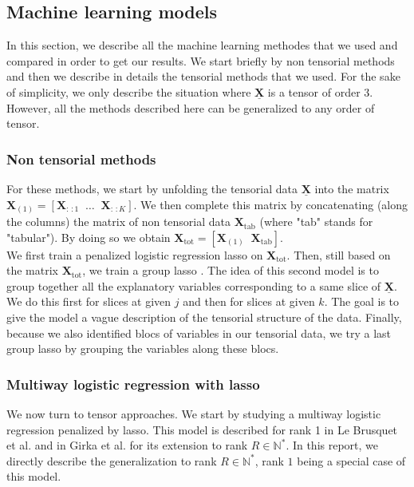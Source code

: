 \documentclass[10pt]{article}
\begin{document}
\subsection{Machine learning models}

In this section, we describe all the machine learning methodes that we used and compared in order to get our results. We start briefly by non tensorial methods and then we describe in details the tensorial methods that we used. For the sake of simplicity, we only describe the situation where $\underline{\mathbf{X}}$ is a tensor of order 3. However, all the methods described here can be generalized to any order of tensor.
\subsubsection{Non tensorial methods}
For these methods, we start by unfolding the tensorial data $\underline{\mathbf{X}}$ into the matrix $\mathbf{X}_{(1)} = [\mathbf{X}_{:\,:1}\; \; \ldots \; \;\mathbf{X}_{:\,:K}]$. We then complete this matrix  by concatenating (along the columns) the matrix of non tensorial data $\mathbf{X}_{\text{tab}}$ (where "tab" stands for "tabular"). By doing so we obtain $\mathbf{X}_{\text{tot}} = [\mathbf{X}_{(1)} \; \; \mathbf{X}_{\text{tab}}]$.\\
\indent We first train a penalized logistic regression lasso on $\mathbf{X}_{\text{tot}}$. Then, still based on the matrix $\mathbf{X}_{\text{tot}}$, we train a group lasso \cite{grp_lasso}. The idea of this second model is to group together all the explanatory variables corresponding to a same slice of $\underline{\mathbf{X}}$. We do this first for slices at given $j$ and then for slices at given $k$.  The goal is to give the model a vague description of the tensorial structure of the data. Finally, because we also identified blocs of variables in our tensorial data, we try a last group lasso by grouping the variables along these blocs.

\subsubsection{Multiway logistic regression with lasso}
\indent We now turn to tensor approaches. We start by studying a multiway logistic regression penalized by lasso. This model is described for rank 1 in Le Brusquet et al. \cite{multi_rank_1} and in Girka et al. \cite{multi_rank_r} for its extension to rank $R \in \mathbb{N}^{*}$. In this report, we directly describe the generalization to rank $R \in \mathbb{N}^{*}$, rank $1$ being a special case of this model.\\[5 pt]
\end{document}
